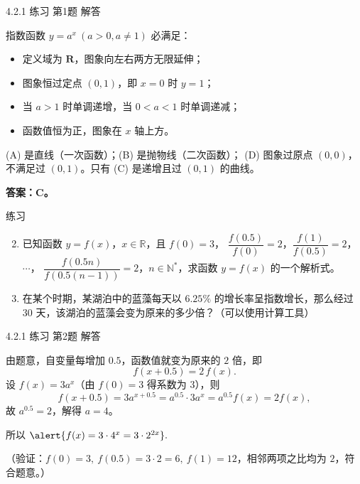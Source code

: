 \documentclass[aspectratio=169,11pt,t,fleqn]{ctexbeamer}
\begin{document}
\begin{frame}[t]{4.2.1 练习 第1题 解答}\vspace{-1em}
	\begin{tcolorbox}[colback=xyyg!10,colframe=xyyg!90,title=\textbf{解}]
		指数函数 $y=a^{x}\ (a>0,a\ne 1)$ 必满足：
		\begin{itemize}
			\item 定义域为 $\mathbf{R}$，图象向左右两方无限延伸；
			\item 图象恒过定点 $(0,1)$，即 $x=0$ 时 $y=1$；
			\item 当 $a>1$ 时单调递增，当 $0<a<1$ 时单调递减；
			\item 函数值恒为正，图象在 $x$ 轴上方。
		\end{itemize}
		
		\vspace{0.4em}
		(A) 是直线（一次函数）；(B) 是抛物线（二次函数）；
		(D) 图象过原点 $(0,0)$，不满足过 $(0,1)$。只有 (C) 是递增且过 $(0,1)$ 的曲线。
		
		\vspace{0.4em}
		\textbf{答案：C。}
	\end{tcolorbox}
\end{frame}


\begin{frame}{练习}
  \begin{enumerate}
    \setcounter{enumi}{1}
    \item 已知函数 $y=f(x)$，$x\in\mathbb{R}$，且 $f(0)=3$，
      $\dfrac{f(0.5)}{f(0)}=2$，$\dfrac{f(1)}{f(0.5)}=2$，$\cdots$，
      $\dfrac{f(0.5n)}{f(0.5(n-1))}=2$，$n\in\mathbb{N}^*$，求函数 $y=f(x)$ 的一个解析式。
    \item 在某个时期，某湖泊中的蓝藻每天以 $6.25\%$ 的增长率呈指数增长，那么经过 30 天，该湖泊的蓝藻会变为原来的多少倍？（可以使用计算工具）
  \end{enumerate}
\end{frame}

\begin{frame}[t]{4.2.1 练习 第2题 解答}\vspace{-1em}
	\begin{tcolorbox}[colback=xyyg!10,colframe=xyyg!90,title=\textbf{解:}]
		由题意，自变量每增加 $0.5$，函数值就变为原来的 $2$ 倍，即
		\[
		f(x+0.5)=2\,f(x).
		\]
		设 $f(x)=3a^{x}$（由 $f(0)=3$ 得系数为 $3$），则
		\[
		f(x+0.5)=3a^{x+0.5}=a^{0.5}\cdot 3a^{x}=a^{0.5}f(x)=2f(x),
		\]
		故 $a^{0.5}=2$，解得 $a=4$。
		
		所以
		$
		\alert{f(x)=3\cdot 4^{x}=3\cdot 2^{2x}}.
		$
		
		\small（验证：$f(0)=3,\ f(0.5)=3\cdot 2=6,\ f(1)=12$，相邻两项之比均为 $2$，符合题意。）
	\end{tcolorbox}
\end{frame}
\end{document}

